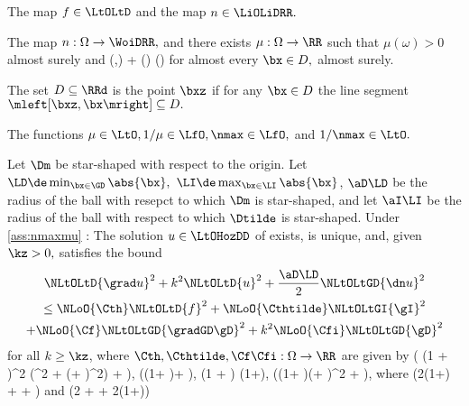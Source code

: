 \label{con:reg}
The map $f \in \LtOLtD$  and the map $n \in \LiOLiDRR.$
\econ

\label{con:nt}
The map $n:\Omega\rightarrow \WoiDRR,$ and there exists $\mu:\Omega\rightarrow \RR$  such that $\mu(\omega) > 0$ almost surely and
\nz(\omega,\bx) + \bx\cdot\grad \nz(\omega\bx) \geq \mu(\omega)
\eeq
for almost every $\bx \in D,$ almost surely.
\econ

The set $D \subseteq \RRd$ is  the point $\bxz$ if for any $\bx \in D$ the line segment $\mleft[\bxz,\bx\mright] \subseteq D.$
\ede

\bas\label{ass:nmaxmu}
The functions $\mu \in \LtO, 1/\mu \in \LfO, \nmax \in \LfO,$ and $1/\nmax \in \LtO.$
\eas

\bth[]Let $\Dm$ be star-shaped with respect to the origin. Let $\LD \de \min_{\bx \in \GD} \abs{\bx},$ $\LI \de\max_{\bx \in \LI} \abs{\bx}$, $\aD\LD$ be the radius of the ball with resepct to which $\Dm$ is star-shaped, and let $\aI\LI$ be the radius of the ball with respect to which $\Dtilde$ is star-shaped. Under \cref{ass:nmaxmu} :
The solution $u \in \LtOHozDD$ of  exists, is unique, and, given $\kz > 0,$ satisfies the bound
\begin{multline*}
  \NLtOLtD{\grad u}^2 + k^2\NLtOLtD{u}^2 + \frac{\aD\LD}{2} \NLtOLtGD{\dn u}^2\\
  \leq \NLoO{\Cth} \NLtOLtD{f}^2 + \NLoO{\Cthtilde} \NLtOLtGI{\gI}^2\\
  + \NLoO{\Cf}\NLtOLtGD{\gradGD \gD}^2 + k^2 \NLoO{\Cfi} \NLtOLtGD{\gD}^2
\end{multline*}
for all $k\geq\kz$, where $\Cth,\Cthtilde,\Cf\Cfi:\Omega\rightarrow\RR$ are given by
\beqs
\Cth {}\max{}\mleft( \mleft(1 +  \nmax \mright)^2 \mleft(\LI^2 + \mleft(\hetbeta + \mright)^2\mright) + \frac{\mu}{2\kz^2 \nmax}\mright),
\eeqs
\beqs
\Cthtilde {}\max{}\mleft(\mleft(1+ \nmax \mright)\Cotilde + \mright),
\eeqs
\beqs
\Cf {} \max{}\mleft(1 +  \nmax\mright) \LD \mleft(1+\mright),\tand
\eeqs
\beqs
\Cfi {} \max{}\mleft(\mleft(1+ \nmax\mright)\mleft(\hetbeta + \mright)^2 + \mright),
\eeqs
where
\beqs
\Cotilde {}\mleft(2\mleft(1+\aI\mright) + \frac{\hetbeta}{\LI} + \mright)\LI
\eeqs
and
\beqs
\hetbeta \de \LI\mleft(2 +  + 2\mleft(1+\mright)\mright)
\eeqs
{}
\enth
{}

